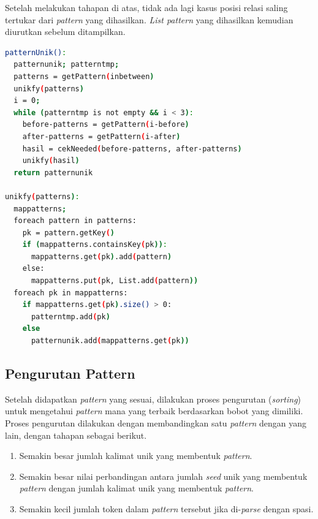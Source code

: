 Setelah melakukan tahapan di atas, tidak ada lagi kasus posisi relasi saling tertukar dari \textit{pattern} yang dihasilkan. \textit{List pattern} yang dihasilkan kemudian diurutkan sebelum ditampilkan.
\begin{lstlisting}[language=bash]
patternUnik():
  patternunik; patterntmp;
  patterns = getPattern(inbetween)
  unikfy(patterns)
  i = 0;
  while (patterntmp is not empty && i < 3):
    before-patterns = getPattern(i-before)
    after-patterns = getPattern(i-after)
    hasil = cekNeeded(before-patterns, after-patterns)
    unikfy(hasil)
  return patternunik

unikfy(patterns):
  mappatterns;
  foreach pattern in patterns:
    pk = pattern.getKey()
    if (mappatterns.containsKey(pk)):
      mappatterns.get(pk).add(pattern)
    else:
      mappatterns.put(pk, List.add(pattern))
  foreach pk in mappatterns:
    if mappatterns.get(pk).size() > 0:
      patterntmp.add(pk)
    else 
      patternunik.add(mappatterns.get(pk))
\end{lstlisting}


\subsection{Pengurutan Pattern}
Setelah didapatkan \textit{pattern} yang sesuai, dilakukan proses pengurutan (\textit{sorting}) untuk mengetahui \textit{pattern} mana yang terbaik berdasarkan bobot yang dimiliki. Proses pengurutan dilakukan dengan membandingkan satu \textit{pattern} dengan yang lain, dengan tahapan sebagai berikut.
\begin{enumerate}
  \item Semakin besar jumlah kalimat unik yang membentuk \textit{pattern}.
  \item Semakin besar nilai perbandingan antara jumlah \textit{seed} unik yang membentuk \textit{pattern} dengan jumlah kalimat unik yang membentuk \textit{pattern}.
  \item Semakin kecil jumlah token dalam \textit{pattern} tersebut jika di-\textit{parse} dengan spasi.
\end{enumerate}

